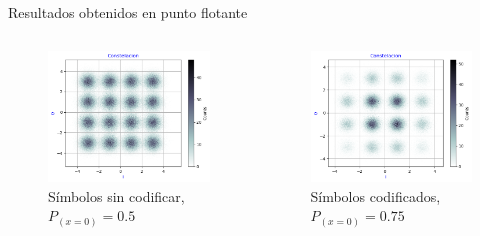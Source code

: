 \documentclass[xcolor=table]{beamer}
\begin{document}
\begin{frame}{Resultados obtenidos en punto flotante}
\begin{columns}

    \begin{column}{0.48\paperwidth}
    \begin{figure}
        \centering
        \includegraphics[width=\textwidth]{Graficos/Constellation_05.png}%
        \caption{Símbolos sin codificar, $P_{(x=0)}=0.5$}
        \label{fig:my_label}
    \end{figure}
    
    \end{column}
    \begin{column}{0.48\paperwidth}  
    
    \begin{figure}
        \centering
        \includegraphics[width=\textwidth]{Graficos/Constellation_025.png}
        \caption{Símbolos codificados, $P_{(x=0)}=0.75$}
        \label{fig:my_label}
    \end{figure}
    
    \end{column}
\end{columns}
\end{frame}
\end{document}
